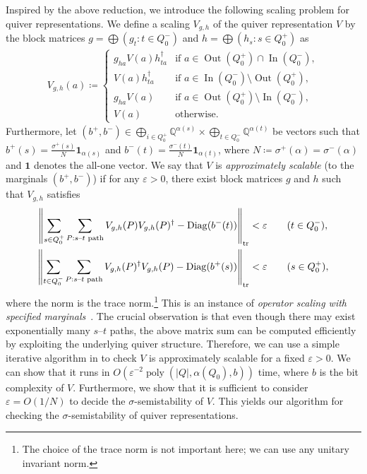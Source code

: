 \documentclass[a4paper,11pt]{article}
\numberwithin{equation}{section}
\newcommand{\Q}{\mathbb{Q}}
\newcommand{\eps}{\varepsilon}
\newcommand{\ones}{\mathbf{1}}
\DeclareMathOperator{\In}{In}
\DeclareMathOperator{\Out}{Out}
\DeclareMathOperator{\tr}{tr}
\DeclareMathOperator{\Diag}{Diag}
\DeclareMathOperator{\poly}{poly}
\DeclarePairedDelimiter{\norm}{\lVert}{\rVert}
\begin{document}
Inspired by the above reduction, we introduce the following scaling problem for quiver representations.
We define a scaling $V_{g,h}$ of the quiver representation $V$ by the block matrices $g = \bigoplus (g_t : t \in Q_0^-)$ and $h = \bigoplus (h_s : s \in Q_0^+)$ as
\begin{align}
    V_{g,h}(a) \coloneqq 
    \begin{cases}
        g_{ha} V(a) h_{ta}^{\dagger}  & \text{if $a \in \Out(Q_0^+) \cap \In(Q_0^-)$}, \\
        V(a) h_{ta}^{\dagger} & \text{if $a \in \In(Q_0^-) \setminus \Out(Q_0^+)$}, \\
        g_{ha} V(a)  & \text{if $a \in \Out(Q_0^+) \setminus \In(Q_0^-)$}, \\
        V(a) & \text{otherwise}.
    \end{cases}
\end{align}
Furthermore, let $(b^+, b^-) \in \bigoplus_{i \in Q_0^+}\Q^{\alpha(s)} \times \bigoplus_{t \in Q_0^-}\Q^{\alpha(t)}$ be vectors such that $b^+(s) = \frac{\sigma^+(s)}{N}\ones_{\alpha(s)}$ and $b^-(t) = \frac{\sigma^-(t)}{N}\ones_{\alpha(t)}$, where $N \coloneqq \sigma^+(\alpha) = \sigma^-(\alpha)$ and $\ones$ denotes the all-one vector.
We say that $V$ is \emph{approximately scalable} (to the marginals $(b^+, b^-)$) if for any $\eps > 0$, there exist block matrices $g$ and $h$ such that $V_{g,h}$ satisfies
\begin{align}
    \norm*{\sum_{s \in Q_0^+} \sum_{P: \text{$s$--$t$ path}} V_{g,h}(P) V_{g,h}(P)^\dagger - \Diag(b^-(t)) }_{\tr} &< \eps \qquad (t \in Q_0^-),\\
    \norm*{\sum_{t \in Q_0^-} \sum_{P: \text{$s$--$t$ path}} V_{g,h}(P)^\dagger V_{g,h}(P) - \Diag(b^+(s)) }_{\tr} &< \eps \qquad (s \in Q_0^+),
\end{align}
where the norm is the trace norm.\footnote{The choice of the trace norm is not important here; we can use any unitary invariant norm.}
This is an instance of \emph{operator scaling with specified marginals}~\citep{Franks2018,Burgisser2018a}.
The crucial observation is that even though there may exist exponentially many $s$--$t$ paths, the above matrix sum can be computed efficiently by exploiting the underlying quiver structure.
Therefore, we can use a simple iterative algorithm in \citep{Burgisser2018a} to check $V$ is approximately scalable for a fixed $\eps > 0$.
We can show that it runs in $O(\eps^{-2}\poly(|Q|, \alpha(Q_0), b))$ time, where $b$ is the bit complexity of $V$.
Furthermore, we show that it is sufficient to consider $\eps = O(1/N)$ to decide the $\sigma$-semistability of $V$.
This yields our algorithm for checking the $\sigma$-semistability of quiver representations.
\end{document}
